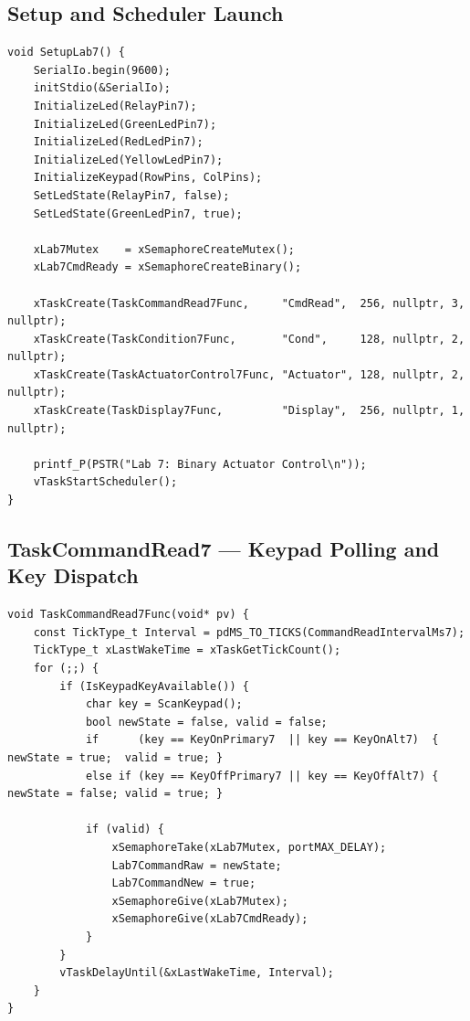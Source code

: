 \documentclass[12pt]{article}
\begin{document}
\subsection{Setup and Scheduler Launch}

\begin{lstlisting}[caption={SetupLab7 --- task creation and welcome banner}]
void SetupLab7() {
    SerialIo.begin(9600);
    initStdio(&SerialIo);
    InitializeLed(RelayPin7);
    InitializeLed(GreenLedPin7);
    InitializeLed(RedLedPin7);
    InitializeLed(YellowLedPin7);
    InitializeKeypad(RowPins, ColPins);
    SetLedState(RelayPin7, false);
    SetLedState(GreenLedPin7, true);

    xLab7Mutex    = xSemaphoreCreateMutex();
    xLab7CmdReady = xSemaphoreCreateBinary();

    xTaskCreate(TaskCommandRead7Func,     "CmdRead",  256, nullptr, 3, nullptr);
    xTaskCreate(TaskCondition7Func,       "Cond",     128, nullptr, 2, nullptr);
    xTaskCreate(TaskActuatorControl7Func, "Actuator", 128, nullptr, 2, nullptr);
    xTaskCreate(TaskDisplay7Func,         "Display",  256, nullptr, 1, nullptr);

    printf_P(PSTR("Lab 7: Binary Actuator Control\n"));
    vTaskStartScheduler();
}
\end{lstlisting}

\subsection{TaskCommandRead7 --- Keypad Polling and Key Dispatch}

\begin{lstlisting}[caption={TaskCommandRead7 --- 50\,ms key-to-bool dispatch}]
void TaskCommandRead7Func(void* pv) {
    const TickType_t Interval = pdMS_TO_TICKS(CommandReadIntervalMs7);
    TickType_t xLastWakeTime = xTaskGetTickCount();
    for (;;) {
        if (IsKeypadKeyAvailable()) {
            char key = ScanKeypad();
            bool newState = false, valid = false;
            if      (key == KeyOnPrimary7  || key == KeyOnAlt7)  { newState = true;  valid = true; }
            else if (key == KeyOffPrimary7 || key == KeyOffAlt7) { newState = false; valid = true; }

            if (valid) {
                xSemaphoreTake(xLab7Mutex, portMAX_DELAY);
                Lab7CommandRaw = newState;
                Lab7CommandNew = true;
                xSemaphoreGive(xLab7Mutex);
                xSemaphoreGive(xLab7CmdReady);
            }
        }
        vTaskDelayUntil(&xLastWakeTime, Interval);
    }
}
\end{lstlisting}
\end{document}
